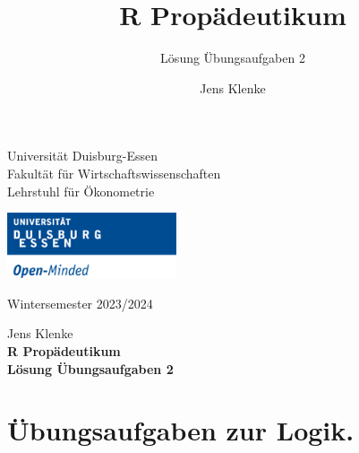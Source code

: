 \documentclass[12pt,a4paper]{article}
\title{R Propädeutikum}
\subtitle{Lösung Übungsaufgaben 2}
\author{Jens Klenke}
\date{}
\begin{document}





\restoregeometry



\begin{minipage}{0.6\textwidth}
Universität Duisburg-Essen\\
Fakultät für Wirtschaftswissenschaften\\
Lehrstuhl für Ökonometrie\\
\end{minipage}

	\begin{flushright}
	\vspace{-3cm}
	\includegraphics*[width=5cm]{includes/duelogo_en.png}\\
	\vspace{.125cm}
	\end{flushright}
\hspace{-0.005cm}Wintersemester 2023/2024

\vspace{0.05cm}

\begin{center}
	\vspace{.25cm}
	Jens Klenke \hspace{.5cm}  \\
	\vspace{.25cm}
	\textbf{\Large{R Propädeutikum}}\\
	\vspace{.25cm}
	\textbf{\large{Lösung Übungsaufgaben 2}}\\
	\vspace{.125cm}
\end{center}





\hypertarget{uxfcbungsaufgaben-zur-logik.}{%
\section{Übungsaufgaben zur Logik.}\label{uxfcbungsaufgaben-zur-logik.}}
\end{document}
